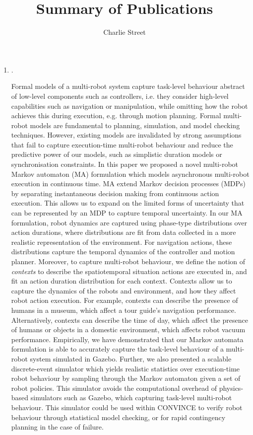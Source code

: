 \documentclass[12pt]{article}
\title{Summary of Publications}
\date{}
\author{Charlie Street}
\begin{document}
\maketitle
\thispagestyle{empty}
\begin{enumerate}
\item {}.


Formal models of a multi-robot system capture task-level behaviour abstract of low-level components such as controllers, i.e. they consider
high-level capabilities such as navigation or manipulation, while omitting how the
robot achieves this during execution, e.g. through motion planning.
%
Formal multi-robot models are fundamental to planning, simulation, and model checking techniques.
%
However, existing models are invalidated by strong assumptions that fail to capture execution-time multi-robot behaviour and reduce the predictive power of our models, such as simplistic duration models or synchronisation constraints.
%
In this paper we proposed a novel multi-robot Markov automaton (MA) formulation which models asynchronous multi-robot execution in continuous time.
%
MA extend Markov decision processes (MDPs) by separating instantaneous decision making from continuous action execution.
%
This allows us to expand on the limited forms of uncertainty that can be represented by an MDP to capture temporal uncertainty.
%
In our MA formulation, robot dynamics are captured using phase-type distributions over action durations, where distributions are fit from data collected in a more realistic representation of the environment.
%
For navigation actions, these distributions capture the temporal dynamics of the controller and motion planner.
%
Moreover, to capture multi-robot behaviour, we define the notion of \emph{contexts} to describe the spatiotemporal situation actions are executed in, and fit an action duration distribution for each context.
%
Contexts allow us to capture the dynamics of the robots and environment, and how they affect robot action execution.
%
For example, contexts can describe the presence of humans in a museum, which affect a tour guide's navigation performance.
%
Alternatively, contexts can describe the time of day, which affect the presence of humans or objects in a domestic environment, which affects robot vacuum performance. 
%
Empirically, we have demonstrated that our Markov automata formulation is able to accurately capture the task-level behaviour of a multi-robot system simulated in Gazebo.
%
Further, we also presented a scalable discrete-event simulator which yields realistic statistics over execution-time robot behaviour by sampling through the Markov automaton given a set of robot policies.
%
This simulator avoids the computational overhead of physics-based simulators such as Gazebo, which capturing task-level multi-robot behaviour.
%
This simulator could be used within CONVINCE to verify robot behaviour through statistical model checking, or for rapid contingency planning in the case of failure.


\end{enumerate}
\end{document}
